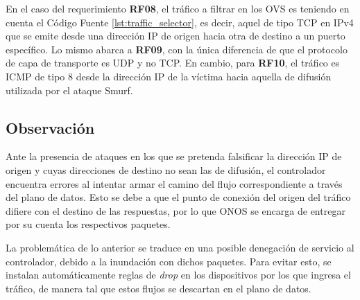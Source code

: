 En el caso del requerimiento \textbf{RF08}, el tráfico a filtrar en los OVS es
teniendo en cuenta el Código Fuente \ref{lst:traffic_selector}, es decir, aquel
de tipo TCP en IPv4 que se emite desde una dirección IP de origen hacia otra de
destino a un puerto específico. Lo mismo abarca a \textbf{RF09}, con la única
diferencia de que el protocolo de capa de transporte es UDP y no TCP. En cambio,
para \textbf{RF10}, el tráfico es ICMP de tipo 8 desde la dirección IP de la
víctima hacia aquella de difusión utilizada por el ataque Smurf.


\subsection *{Observación}

Ante la presencia de ataques en los que se pretenda falsificar la dirección IP
de origen y cuyas direcciones de destino no sean las de difusión, el controlador
encuentra errores al intentar armar el camino del flujo correspondiente a través
del plano de datos. Esto se debe a que el punto de conexión del origen del
tráfico difiere con el destino de las respuestas, por lo que ONOS se encarga de
entregar por su cuenta los respectivos paquetes.

La problemática de lo anterior se traduce en una posible denegación de servicio
al controlador, debido a la inundación con dichos paquetes. Para evitar esto, se
instalan automáticamente reglas de \textit{drop} en los dispositivos por los que
ingresa el tráfico, de manera tal que estos flujos se descartan en el plano de
datos.
